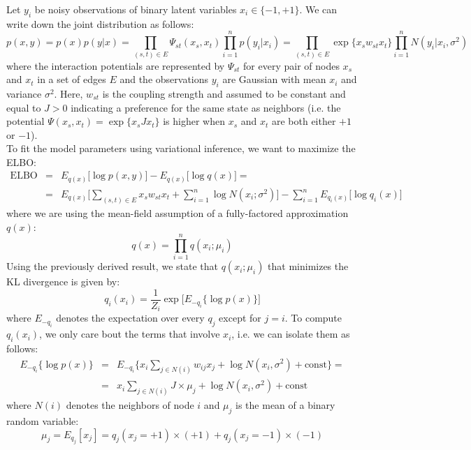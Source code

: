 Let $y_i$ be noisy observations of binary latent variables $x_i \in \{-1,+1\}$. We can write down the joint distribution as follows:
\begin{equation}
    p(x,y) = p(x)p(y|x) = \prod_{(s,t)\in E} \Psi_{st}(x_s, x_t)\prod_{i=1}^{n}p(y_i|x_i) = \prod_{(s,t)\in E} \exp\{x_s w_{st} x_t\}\prod_{i=1}^{n} N(y_i|x_i, \sigma^2)
\end{equation}
where the interaction potentials are represented by $\Psi_{st}$ for every pair of nodes $x_s$ and $x_t$ in a set of edges $E$ and the observations $y_i$ are Gaussian with mean $x_i$ and variance $\sigma^2$. Here, $w_{st}$ is the coupling strength and assumed to be constant and equal to $J>0$ indicating a preference for the same state as neighbors (i.e. the potential $\Psi(x_s, x_t)=\exp \{ x_s J x_t\}$ is higher when $x_s$ and $x_t$ are both either $+1$ or $-1$).\\

To fit the model parameters using variational inference, we want to maximize the ELBO:
\begin{eqnarray}
    \mathrm{ELBO} &=& E_{q(x)}\bigg[\log p(x,y)\bigg] - E_{q(x)}\bigg[\log q(x)\bigg] = \\
    &=& E_{q(x)}\bigg[\sum_{(s,t)\in E}x_s w_{st} x_t + \sum_{i=1}^{n}\log N(x_i;\sigma^2) \bigg] - \sum_{i=1}^{n}E_{q_i(x)}\bigg[\log q_i(x)\bigg]
\end{eqnarray}
where we are using the mean-field assumption of a fully-factored approximation $q(x)$:
\begin{equation}
    q(x) = \prod_{i=1}^{n} q(x_i; \mu_i)
\end{equation}
Using the previously derived result, we state that $q(x_i;\mu_i)$ that minimizes the KL divergence is given by:
\begin{equation}
    q_i(x_i) = \frac{1}{Z_i} \exp \bigg[E_{-q_i}\{\log p(x)\}\bigg]
\end{equation}
where $E_{-q_i}$ denotes the expectation over every $q_j$ except for $j=i$. To compute $q_i(x_i)$, we only care bout the terms that involve $x_i$, i.e. we can isolate them as follows:
\begin{eqnarray}
    E_{-q_i}\{\log p(x)\} &=& E_{-q_i}\{x_i \sum_{j\in N(i)}w_{ij}x_j + \log N(x_i,\sigma^2) + \mathrm{const}\} = \\ 
    &=& x_i \sum_{j\in N(i)}J\times \mu_j + \log N(x_i,\sigma^2) + \mathrm{const}
\end{eqnarray}
where $N(i)$ denotes the neighbors of node $i$ and $\mu_j$ is the mean of a binary random variable:
\begin{equation}
    \mu_j = E_{q_j}[x_j] = q_j(x_j=+1)\times (+1) + q_j(x_j=-1)\times (-1)
\end{equation}

